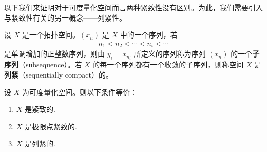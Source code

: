 以下我们来证明对于可度量化空间而言两种紧致性没有区别。为此，我们需要引入与紧致性有关的另一概念——列紧性。

\begin{definition}\label{definition:ch03-subsequence-sequentially-compact}
设 $X$ 是一个拓扑空间。$(x_{n})$ 是 $X$ 中的一个序列，若
\begin{align*}
n_{1}<n_{2}<\cdots<n_{i}<\cdots
\end{align*}
是单调增加的正整数序列，则由 $y_{i}=x_{n_{i}}$ 所定义的序列称为序列 $(x_{n})$ 的一个\textbf{子序列}（subsequence）。若 $X$ 的每一个序列都有一个收敛的子序列，则称空间 $X$ 是\textbf{列紧}（sequentially compact）的。
\end{definition}

\begin{theorem}\label{theorem:ch03-metrizable-compact-equiv}
设 $X$ 为可度量化空间。则以下条件等价：
\begin{enumerate}
\item $X$ 是紧致的.
\item $X$ 是极限点紧致的.
\item $X$ 是列紧的.
\end{enumerate}
\end{theorem}

